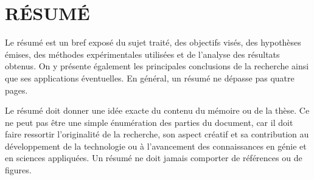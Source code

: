 %
%
\chapter*{RÉSUMÉ}\thispagestyle{headings}

Le résumé est un bref exposé du sujet traité, des objectifs visés,
des hypothèses émises, des méthodes expérimentales utilisées et de
l'analyse des résultats obtenus. On y présente également les
principales conclusions de la recherche ainsi que ses applications
éventuelles. En général, un résumé ne dépasse pas quatre pages.

Le résumé doit donner une idée exacte du contenu du mémoire ou de la thèse. Ce ne
peut pas être une simple énumération des parties du document, car il
doit faire ressortir l'originalité de la recherche, son aspect
créatif et sa contribution au développement de la technologie ou à
l'avancement des connaissances en génie et en sciences appliquées.
Un résumé ne doit jamais comporter de références ou de figures.
